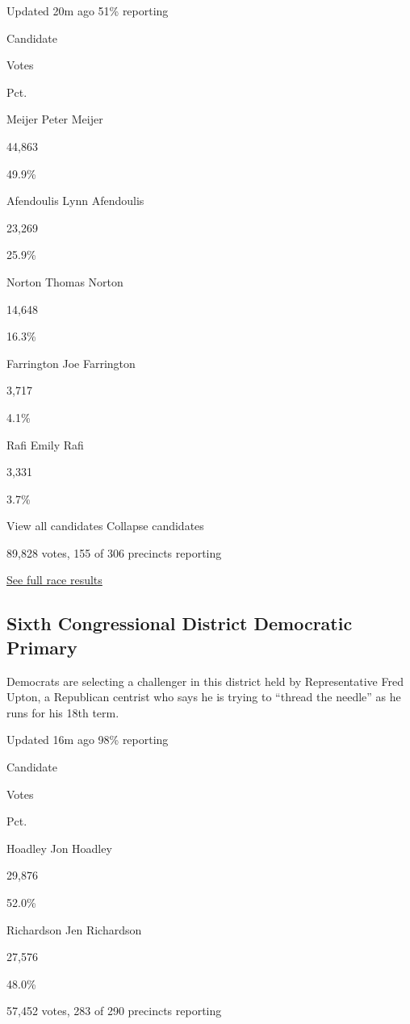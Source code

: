 Updated 20m ago 51\% reporting

Candidate

Votes

Pct.

 Meijer Peter Meijer

44,863

49.9\%

 Afendoulis Lynn Afendoulis

23,269

25.9\%

 Norton Thomas Norton

14,648

16.3\%

 Farrington Joe Farrington

3,717

4.1\%

 Rafi Emily Rafi

3,331

3.7\%

View all candidates Collapse candidates

89,828 votes, 155 of 306 precincts reporting

\href{https://www.nytimes.com/interactive/2020/08/04/us/elections/results-michigan-house-district-3-primary-election.html}{See
full race results}

\hypertarget{sixth-congressional-district-democratic-primary}{%
\subsection{Sixth Congressional District Democratic
Primary}\label{sixth-congressional-district-democratic-primary}}

Democrats are selecting a challenger in this district held by
Representative Fred Upton, a Republican centrist who says he is trying
to ``thread the needle'' as he runs for his 18th term.

Updated 16m ago 98\% reporting

Candidate

Votes

Pct.

 Hoadley Jon Hoadley

29,876

52.0\%

 Richardson Jen Richardson

27,576

48.0\%

57,452 votes, 283 of 290 precincts reporting


